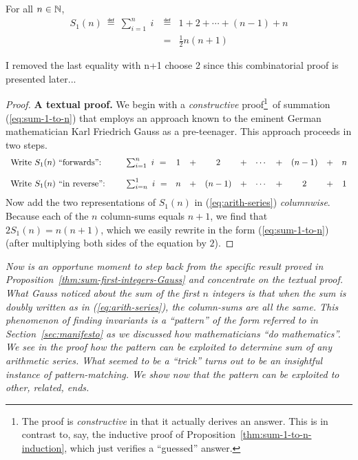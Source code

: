 \begin{prop}
\label{thm:sum-first-integers-Gauss}
For all $n \in \mathbb{N}$,
\begin{eqnarray}
\nonumber
S_1(n) \ \eqdef \ \sum_{i=1}^n \ i \
  & \eqdef &
 1 + 2 + \cdots + (n-1) + n \\
\label{eq:sum-1-to-n}
  & = & \frac{1}{2} n (n+1) 
\end{eqnarray}
\end{prop}

{\Denis I removed the last equality with n+1 choose 2 since this combinatorial proof is presented later...}

\begin{proof}
{\bf A textual proof.}
%
We begin with a {\em constructive} proof\footnote{The proof is {\em
    constructive} in that it actually derives an answer.  This is in
  contrast to, say, the inductive proof of
  Proposition~\ref{thm:sum-1-to-n-induction}, which just verifies a
  ``guessed'' answer.}~of summation (\ref{eq:sum-1-to-n}) that employs
an approach known to the eminent German mathematician Karl Friedrich
Gauss \index{Gauss, Karl Friedrich} as a pre-teenager.
This approach proceeds in two steps.
\begin{equation}
\label{eq:arith-series}
\begin{array}{llccccccccc}
\mbox{Write $S_1(n)$ ``forwards'':} &
\hspace*{.2in}\sum_{i=1}^n \ i \ = & 1 & + & 2   & + & \cdots & + & (n-1) & + & n \\
 & & & & & & & & & &  \\
\mbox{Write $S_1(n)$ ``in reverse'':} &
\hspace*{.2in}\sum_{i=n}^1 \ i \ = & n & + & (n-1) & + & \cdots & + & 2   & + & 1
\end{array}
\end{equation}
Now add the two representations of $S_1(n)$ in (\ref{eq:arith-series})
{\em columnwise}.  Because each of the $n$ column-sums equals $n+1$,
we find that $2 S_1(n) = n(n+1)$, which we easily rewrite in the form
(\ref{eq:sum-1-to-n}) (after multiplying both sides of the equation by
$2$).
\end{proof}

\medskip

%
{\em Now is an opportune moment to step back from the specific result
  proved in Proposition~\ref{thm:sum-first-integers-Gauss} and
  concentrate on the textual proof.  What Gauss noticed about the sum
  of the first $n$ integers is that when the sum is doubly written as
  in (\ref{eq:arith-series}), the column-sums are all the same.  This
  phenomenon of {\em finding invariants} is a ``pattern'' of the form
  referred to in Section~\ref{sec:manifesto} as we discussed how
  mathematicians ``do mathematics''.  We see in the proof how the
  pattern can be exploited to determine sum of any arithmetic series.
  {\em What seemed to be a ``trick'' turns out to be an insightful
    instance of pattern-matching.}  We show now that the pattern can
  be exploited to other, related, ends.}

